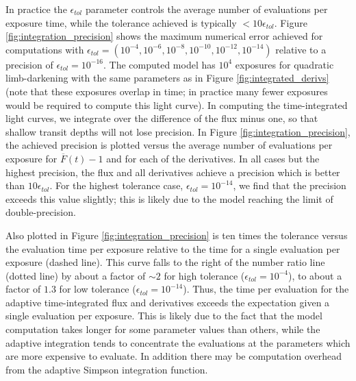 \documentclass[modern,trackchanges]{aastex63}
\newcommand{\edited}{}
\begin{document}
{\edited In practice the $\epsilon_{tol}$ parameter controls the average number of evaluations
per exposure time, while the tolerance achieved is typically $<10 \epsilon_{tol}$.
Figure \ref{fig:integration_precision} shows the maximum numerical error achieved
for computations with $\epsilon_{tol} = (10^{-4},10^{-6},10^{-8},10^{-10},10^{-12},10^{-14})$
relative to a precision of $\epsilon_{tol} = 10^{-16}$.    The
computed model has $10^4$ exposures for quadratic limb-darkening with the same parameters 
as in Figure \ref{fig:integrated_derivs}
(note that these exposures overlap in time;  in practice many fewer exposures would
be required to compute this light curve).  In computing the time-integrated light
curves, we integrate over the difference of the flux minus one, so that shallow
transit depths will not lose precision.  In Figure \ref{fig:integration_precision},
the achieved precision is plotted versus the average number of evaluations per exposure
for $\overline{F}(t)-1$ and for each of the derivatives.  In all cases but the highest precision,
the flux and all derivatives achieve a precision which is better than $10 \epsilon_{tol}$.
For the highest tolerance case, $\epsilon_{tol} = 10^{-14}$, we find that the
precision exceeds this value slightly;  this is likely due to the model reaching
the limit of double-precision.

Also plotted in Figure \ref{fig:integration_precision} is ten times the
tolerance versus the evaluation time
per exposure relative to the time for a single evaluation per exposure
(dashed line).  This
curve falls to the right of the number ratio line (dotted line) by about 
a factor of $\sim 2$
for high tolerance ($\epsilon_{tol} = 10^{-4}$), to about a factor of $1.3$
for low tolerance ($\epsilon_{tol} = 10^{-14}$).  Thus, the time per
evaluation for the adaptive time-integrated flux and derivatives exceeds the 
expectation given a single evaluation per exposure.  This is likely due to 
the fact that the model computation takes longer for some parameter values 
than others, while the adaptive integration tends to concentrate the 
evaluations at the parameters which are more expensive to evaluate.  In 
addition there may be computation overhead from the adaptive Simpson integration 
function.

}
\end{document}

